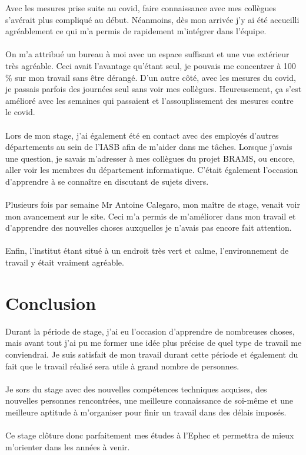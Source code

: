 \documentclass[11pt]{article}
\begin{document}
Avec les mesures prise suite au covid, faire connaissance avec mes collègues s'avérait plus compliqué au début.
Néanmoins, dès mon arrivée j'y ai été accueilli agréablement ce qui m'a permis de rapidement m'intégrer dans l'équipe.\\
\\
On m'a attribué un bureau à moi avec un espace suffisant et une vue extérieur très agréable.
Ceci avait l'avantage qu'étant seul, je pouvais me concentrer à 100 \% sur mon travail sans être dérangé.
D'un autre côté, avec les mesures du covid, je passais parfois des journées seul sans voir mes collègues.
Heureusement, ça s'est amélioré avec les semaines qui passaient et l'assouplissement des mesures contre le covid.\\
\\
Lors de mon stage, j'ai également été en contact avec des employés d'autres départements au sein de l'IASB afin de m'aider dans me tâches.
Lorsque j'avais une question, je savais m'adresser à mes collègues du projet BRAMS, ou encore, aller voir les membres du département informatique.
C'était également l'occasion d'apprendre à se connaître en discutant de sujets divers.\\
\\
Plusieurs fois par semaine Mr Antoine Calegaro, mon maître de stage, venait voir mon avancement sur le site.
Ceci m'a permis de m'améliorer dans mon travail et d'apprendre des nouvelles choses auxquelles je n'avais pas encore fait attention.\\
\\
Enfin, l'institut étant situé à un endroit très vert et calme, l'environnement de travail y était vraiment agréable.

\newpage

\section{Conclusion}
Durant la période de stage, j'ai eu l'occasion d'apprendre de nombreuses choses, mais avant tout j'ai pu me former une idée plus précise de quel type de travail me conviendrai.
Je suis satisfait de mon travail durant cette période et également du fait que le travail réalisé sera utile à grand nombre de personnes.\\
\\
Je sors du stage avec des nouvelles compétences techniques acquises, des nouvelles personnes rencontrées, une meilleure connaissance de soi-même et une meilleure aptitude à m'organiser pour finir un travail dans des délais imposés.\\
\\
Ce stage clôture donc parfaitement mes études à l'Ephec et permettra de mieux m'orienter dans les années à venir.
\end{document}

